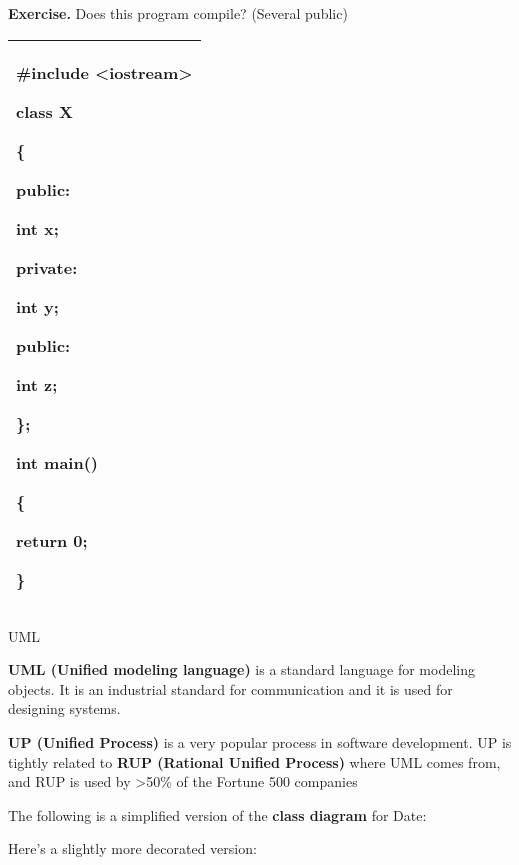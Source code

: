 \documentclass[
]{article}
\begin{document}
\textbf{Exercise.} Does this program compile? (Several public)

\begin{longtable}[]{@{}l@{}}
\toprule
\endhead
\begin{minipage}[t]{0.97\columnwidth}\raggedright
\#include \textless iostream\textgreater{}

class X

\{

public:

int x;

private:

int y;

public:

int z;

\};

int main()

\{

return 0;

\}\strut
\end{minipage}\tabularnewline
\bottomrule
\end{longtable}

UML

\textbf{UML (Unified modeling language)} is a standard language for
modeling objects. It is an industrial standard for communication and it
is used for designing systems.

\textbf{UP (Unified Process)} is a very popular process in software
development. UP is tightly related to \textbf{RUP (Rational Unified
Process)} where UML comes from, and RUP is used by \textgreater50\% of
the Fortune 500 companies

The following is a simplified version of the \textbf{class diagram} for
Date:

Here's a slightly more decorated version:
\end{document}
